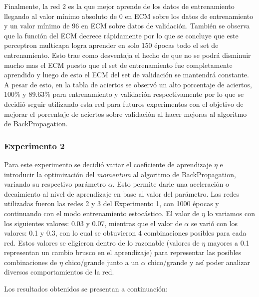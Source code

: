  Finalmente, la red 2 es la que mejor aprende de los datos de entrenamiento llegando al valor mínimo absoluto de 0 en ECM sobre los datos de entrenamiento y un valor mínimo
 de 96 en ECM sobre datos de validación. También se observa que la función del ECM decrece rápidamente por lo que se concluye que este perceptron multicapa
 logra aprender en solo 150 épocas todo el set de entrenamiento. Esto trae como desventaja el hecho de que no se podrá disminuir mucho mas el ECM puesto que el set
 de entrenamiento fue completamente aprendido y luego de esto el ECM del set de validación se mantendrá constante.
 A pesar de esto, en la tabla de aciertos se observó un alto
 porcentaje de aciertos, 100\% y 89.63\% para entrenamiento y validación respectivamente por lo que se decidió seguir utilizando esta red para futuros experimentos
 con el objetivo de mejorar el porcentaje de aciertos sobre validación al hacer mejoras al algoritmo de BackPropagation.

\subsubsection{Experimento 2}
Para este experimento se decidió variar el coeficiente de aprendizaje $\eta$ e introducir la optimización del \textit{momentum} al algoritmo de BackPropagation,
variando su respectivo parámetro $\alpha$. Esto permite darle una aceleración o decaimiento al nivel de aprendizaje en base al valor del parámetro.
Las redes utilizadas fueron las redes 2 y 3 del Experimento 1, con 1000 épocas y continuando con el modo entrenamiento estocástico.
El valor de $\eta$ lo variamos con los siguientes valores: 0.03 y 0.07, mientras que el valor de $\alpha$ se varió con los valores: 0.1 y 0.3,
con lo cual se obtuvieron 4 combinaciones posibles para cada red. Estos valores se eligieron dentro de lo razonable (valores de $\eta$ mayores a 0.1
representan un cambio brusco en el aprendizaje) para representar las posibles combinaciones de $\eta$ chico/grande junto a un $\alpha$ chico/grande y
 así poder analizar diversos comportamientos de la red.

 Los resultados obtenidos se presentan a continuación:

